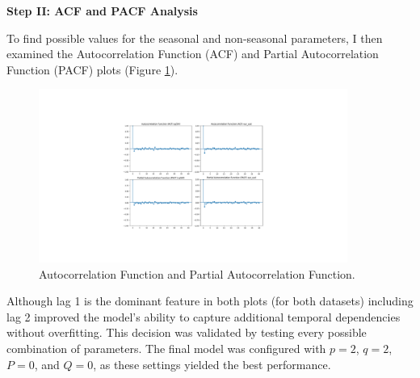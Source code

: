 \textbf{Step II: ACF and PACF Analysis}

To find possible values for the seasonal and non-seasonal parameters, I then examined the Autocorrelation Function (ACF) and Partial Autocorrelation Function (PACF) plots (Figure \ref{fig:ACF and PACF}).
\begin{figure}[H]
    \centering
    \includegraphics[width=0.9\textwidth]{Machine_learning_thesis/Images/ACF and PACF.png}
    \caption{Autocorrelation Function and Partial Autocorrelation Function.} 
    \label{fig:ACF and PACF}
\end{figure}
Although lag 1 is the dominant feature in both plots (for both datasets) including lag 2 improved the model's ability to capture additional temporal dependencies without overfitting. This decision was validated by testing every possible combination of parameters. The final model was configured with $p=2$, $q=2$, $P=0$, and $Q=0$, as these settings yielded the best performance.


